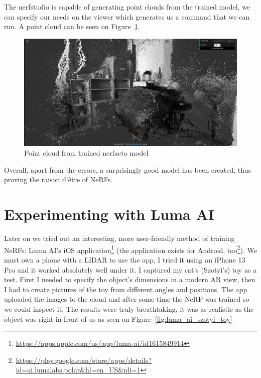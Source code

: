 The nerfstudio is capable of generating point clouds from the trained model, we can specify our needs on the viewer which generates us a command that we can run. A point cloud can be seen on Figure~\ref{fig:nerfstudio_point_cloud}.

\begin{figure}[htbp]
	\centering
	\includegraphics[width=150mm, keepaspectratio]{figures/nerfacto_point_cloud1.png}
	\caption{Point cloud from trained nerfacto model}
	\label{fig:nerfstudio_point_cloud}
\end{figure}

Overall, apart from the errors, a surprisingly good model has been created, thus proving the raison d'être of NeRFs.

\section{Experimenting with Luma AI}

Later on we tried out an interesting, more user-friendly method of training NeRFs: Luma AI's iOS application\footnote{\url{https://apps.apple.com/us/app/luma-ai/id1615849914}} (the application exists for Android, too\footnote{\url{https://play.google.com/store/apps/details?id=ai.lumalabs.polar&hl=en_US&pli=1}}). We must own a phone with a LIDAR to use the app, I tried it using an iPhone 13 Pro and it worked absolutely well under it. I captured my cat's (Szotyi's) toy as a test. First I needed to specify the object's dimensions in a modern AR view, then I had to create pictures of the toy from different angles and positions. The app uploaded the images to the cloud and after some time the NeRF was trained so we could inspect it. The results were truly breathtaking, it was as realistic as the object was right in front of us as seen on Figure~\ref{fig:luma_ai_szotyi_toy}

